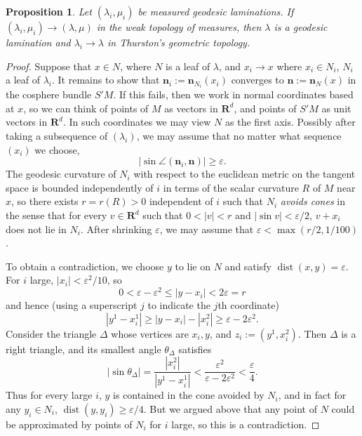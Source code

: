 \documentclass[reqno,10pt]{amsart}
\newcommand{\RR}{\mathbf{R}}
\DeclareMathOperator{\dist}{dist}
\newcommand{\normal}{\mathbf n}
\newcommand{\dfn}[1]{\emph{#1}\index{#1}}
\newtheorem{proposition}[theorem]{Proposition}
\theoremstyle{definition}
\numberwithin{equation}{section}
\begin{document}
\begin{proposition}\label{measured implies Thurston}
Let $(\lambda_i, \mu_i)$ be measured geodesic laminations.
If $(\lambda_i, \mu_i) \to (\lambda, \mu)$ in the weak topology of measures, then $\lambda$ is a geodesic lamination and $\lambda_i \to \lambda$ in Thurston's geometric topology.
\end{proposition}
\begin{proof}
Suppose that $x \in N$, where $N$ is a leaf of $\lambda$, and $x_i \to x$ where $x_i \in N_i$, $N_i$ a leaf of $\lambda_i$.
It remains to show that $\normal_i := \normal_{N_i}(x_i)$ converges to $\normal := \normal_N(x)$ in the cosphere bundle $S'M$.
If this fails, then we work in normal coordinates based at $x$, so we can think of points of $M$ as vectors in $\RR^d$, and points of $S'M$ as unit vectors in $\RR^d$.
In such coordinates we may view $N$ as the first axis.
Possibly after taking a subsequence of $(\lambda_i)$, we may assume that no matter what sequence $(x_i)$ we choose,
$$|\sin \angle(\normal_i, \normal)| \geq \varepsilon.$$
The geodesic curvature of $N_i$ with respect to the euclidean metric on the tangent space is bounded independently of $i$ in terms of the scalar curvature $R$ of $M$ near $x$, so there exists $r = r(R) > 0$ independent of $i$ such that $N_i$ \dfn{avoids cones} in the sense that for every $v \in \RR^d$ such that $0 < |v| < r$ and $|\sin v| < \varepsilon/2$, $v + x_i$ does not lie in $N_i$.
After shrinking $\varepsilon$, we may assume that $\varepsilon < \max(r/2, 1/100)$.

To obtain a contradiction, we choose $y$ to lie on $N$ and satisfy $\dist(x, y) = \varepsilon$.
For $i$ large, $|x_i| < \varepsilon^2/10$, so
$$0 < \varepsilon - \varepsilon^2 \leq |y - x_i| < 2\varepsilon = r$$
and hence (using a superscript $j$ to indicate the $j$th coordinate)
$$|y^1 - x_i^1| \geq |y - x_i| - |x_i^2| \geq \varepsilon - 2\varepsilon^2.$$
Consider the triangle $\Delta$ whose vertices are $x_i, y$, and $z_i := (y^1, x_i^2)$.
Then $\Delta$ is a right triangle, and its smallest angle $\theta_\Delta$ satisfies
$$|\sin \theta_\Delta| = \frac{|x_i^2|}{|y^1 - x_i^1|} < \frac{\varepsilon^2}{\varepsilon - 2\varepsilon^2} < \frac{\varepsilon}{4}.$$
Thus for every large $i$, $y$ is contained in the cone avoided by $N_i$, and in fact for any $y_i \in N_i$, $\dist(y, y_i) \geq \varepsilon/4$.
But we argued above that any point of $N$ could be approximated by points of $N_i$ for $i$ large, so this is a contradiction.
\end{proof}
\end{document}
